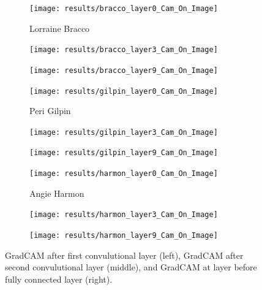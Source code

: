 \documentclass{article}
\begin{document}
\begin{figure}
	\begin{subfigure}[t]{0.33\linewidth}
		\texttt{[image: results/bracco\_layer0\_Cam\_On\_Image]}
		\caption{Lorraine Bracco}
	\end{subfigure}
	\begin{subfigure}[t]{0.33\linewidth}
		\texttt{[image: results/bracco\_layer3\_Cam\_On\_Image]}
	\end{subfigure}
	\begin{subfigure}[t]{0.33\linewidth}
		\texttt{[image: results/bracco\_layer9\_Cam\_On\_Image]}
	\end{subfigure}\vspace{1em}
	\begin{subfigure}[t]{0.33\linewidth}
		\texttt{[image: results/gilpin\_layer0\_Cam\_On\_Image]}
		\caption{Peri Gilpin}
	\end{subfigure}
	\begin{subfigure}[t]{0.33\linewidth}
		\texttt{[image: results/gilpin\_layer3\_Cam\_On\_Image]}
	\end{subfigure}
	\begin{subfigure}[t]{0.33\linewidth}
		\texttt{[image: results/gilpin\_layer9\_Cam\_On\_Image]}
	\end{subfigure}\vspace{1em}
	\begin{subfigure}[t]{0.33\linewidth}
		\texttt{[image: results/harmon\_layer0\_Cam\_On\_Image]}
		\caption{Angie Harmon}
	\end{subfigure}
	\begin{subfigure}[t]{0.33\linewidth}
		\texttt{[image: results/harmon\_layer3\_Cam\_On\_Image]}
	\end{subfigure}
	\begin{subfigure}[t]{0.33\linewidth}
		\texttt{[image: results/harmon\_layer9\_Cam\_On\_Image]}
	\end{subfigure}\vspace{1em}
	\caption{GradCAM after first convulutional layer (left), GradCAM after second convulutional layer (middle), and GradCAM at layer before fully connected layer (right).}
\end{figure}
\end{document}
